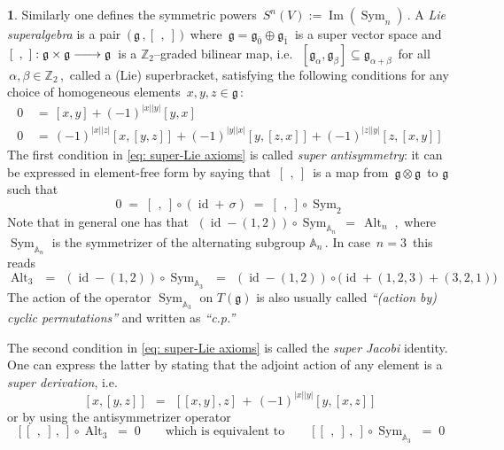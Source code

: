 \documentclass[12pt,reqno,twoside,a4paper]{amsart}
\numberwithin{equation}{section}
\theoremstyle{definition}
\newtheorem{free text}[lema]{}
\theoremstyle{remark}
\newcommand \id{\operatorname{id}}
\newcommand \Alt{\operatorname{Alt}}
\newcommand \Sym{\operatorname{Sym}}
\newcommand \Img{\operatorname{Im}}
\newcommand{\zero}{{\bar{0}}}
\newcommand{\one}{{\bar{1}}}
\def \ZZ {\mathbb{Z}}
\def \lieg{\mathfrak{g}}
\theoremstyle{plain}
\begin{document}
\begin{free text}
%
 \vskip1pt
%
   Similarly one defines the symmetric powers  $ \, S^n(V) := \Img(\Sym_n) \, $.
%
 \vskip3pt
%
   A  \emph{Lie superalgebra\/}  is a pair  $ \, \big(\, \lieg \, , [\,\ ,\ ] \,\big) \, $  where  $ \, \lieg = \lieg_{\zero} \oplus \lieg_{\one} \, $  is a super vector space and  $ \, [\,\ ,\ ] : \lieg \times \lieg \relbar\joinrel\longrightarrow \lieg \, $  is a  $ \ZZ_2 $--graded  bilinear map, i.e.\  $ \, [\lieg_\alpha,\lieg_\beta] \subseteq \lieg_{\alpha+\beta} \, $  for all  $ \, \alpha , \beta \in \ZZ_2 \, $,  \,called a (Lie) superbracket, satisfying the following conditions for any choice of homogeneous elements  $ \, x , y , z \in \lieg \, $:
%
\begin{equation}   \label{eq: super-Lie axioms}
  \begin{aligned}
    0  &  \, = \,  [x,y] + {(-1)}^{|x||y|} [y,x]  \\
    0  &  \, = \,  {(-1)}^{|x||z|} [x,[y,z]] + {(-1)}^{|y||x|} [y,[z,x]] + {(-1)}^{|z||y|} [z,[x,y]]
  \end{aligned}
\end{equation}
%
   \indent   The first condition in  \eqref{eq: super-Lie axioms}  is called  \emph{super
   antisymmetry\/}:  it can be expressed in element-free form by saying that  $ \, [\,\ ,\ ] \, $  is a map from  $ \, \lieg \otimes \lieg \, $  to  $ \lieg $  such that
%
  $$  0  \; = \;  [\,\ ,\ ] \circ (\id + \,\sigma)  \; = \;  [\,\ ,\ ] \circ \Sym_2  $$
%
   \indent   Note that in general one has that  $ \; (\id - (1,2)) \circ \Sym_{\mathbb{A}_n} \, = \, \Alt_n \; $,  \,where  $ \Sym_{\mathbb{A}_n} $ is the symmetrizer of the alternating subgroup  $ \mathbb{A}_n \, $.  In case  $ \, n = 3 \, $  this reads
%
  $$  \Alt_3  \,\; = \;\,  (\id - (1,2)) \circ \Sym_{\mathbb{A}_3}  \,\; = \;\,  (\id - (1,2)) \circ \big(\id + (1,2,3) + (3,2,1) \big)  $$
%
 The action of the operator  $ \Sym_{\mathbb{A}_3} $  on $ T(\lieg) $  is also usually called  \emph{``(action by) cyclic permutations''\/}  and written as \emph{``c.p.''}
                                                    \par
   The second condition in  \eqref{eq: super-Lie axioms}  is called the  \emph{super Jacobi\/}  identity.  One can express the latter by stating that the adjoint action of any element is a  \emph{super derivation},  i.e.
%
  $$  [x,[y,z]]   \,\; = \;\,  [[x,y],z] \, + \, {(-1)}^{|x||y|}[y,[x,z]]  $$
%
 or by using the antisymmetrizer operator
%
  $$  [[\,\ ,\ ]\,,\ ] \circ \Alt_3  \; = \;  0   \qquad  \text{which is equivalent to}  \qquad   [[\,\ ,\ ]\,,\ ] \circ \Sym_{\mathbb{A}_3}  \; = \;  0  $$

\end{free text}
\end{document}
